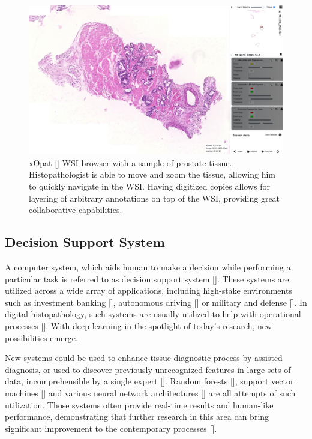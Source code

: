 \begin{figure}
    \begin{center}
    \begin{minipage}{0.75\textwidth}
      \includegraphics[width=\textwidth]{img/xopat.png}
    \end{minipage}
    \caption{xOpat [] WSI browser with a sample of prostate tissue. Histopathologist is able to move and zoom the tissue, allowing him to quickly navigate in the WSI. Having digitized copies allows for layering of arbitrary annotations on top of the WSI, providing great collaborative capabilities.}
    \label{fig:xopat}
    \end{center}
\end{figure}

\subsection*{Decision Support System}

A computer system, which aids human to make a decision while performing a particular task is referred to as decision support system [].
These systems are utilized across a wide array of applications, including high-stake environments such as investment banking [], autonomous driving [] or military and defense []. In digital histopathology, such systems are usually utilized to help with operational processes [].
With deep learning in the spotlight of today's research, new possibilities emerge.

New systems could be used to enhance tissue diagnostic process by assisted diagnosis, or used to discover previously unrecognized features in large sets of data, incomprehensible by a single expert []. %
Random forests [], support vector machines [] and various neural network architectures [] are all attempts of such utilization.
Those systems often provide real-time results and human-like performance, demonstrating that further research in this area can bring significant improvement to the contemporary processes [].

